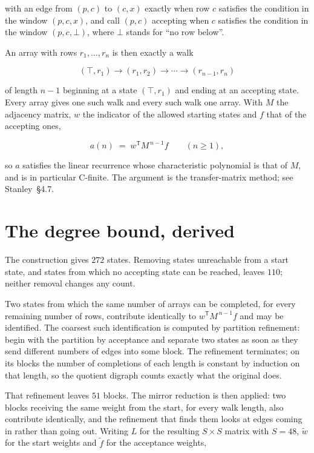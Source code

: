 \documentclass[11pt]{article}
\theoremstyle{definition}
\begin{document}
with an edge from $(p,c)$ to $(c,x)$ exactly when row $c$ satisfies the condition in the window $(p,c,x)$, and call $(p,c)$ accepting when $c$ satisfies the condition in the window $(p,c,\bot)$, where $\bot$ stands for ``no row below''.

An array with rows $r_1,\dots,r_n$ is then exactly a walk

\[(\top,r_1) \to (r_1,r_2) \to \cdots \to (r_{n-1},r_n)\]

of length $n-1$ beginning at a state $(\top,r_1)$ and ending at an accepting state. Every array gives one such walk and every such walk one array. With $M$ the adjacency matrix, $w$ the indicator of the allowed starting states and $f$ that of the accepting ones,

\[a(n) \;=\; w^{\mathsf T} M^{\,n-1} f \qquad (n \ge 1),\]

so $a$ satisfies the linear recurrence whose characteristic polynomial is that of $M$, and is in particular C-finite. The argument is the transfer-matrix method; see Stanley~\S4.7.

\section{The degree bound, derived}

The construction gives $272$ states. Removing states unreachable from a start state, and states from which no accepting state can be reached, leaves $110$; neither removal changes any count.

Two states from which the same number of arrays can be completed, for every remaining number of rows, contribute identically to $w^{\mathsf T}M^{\,n-1}f$ and may be identified. The coarsest such identification is computed by partition refinement: begin with the partition by acceptance and separate two states as soon as they send different numbers of edges into some block. The refinement terminates; on its blocks the number of completions of each length is constant by induction on that length, so the quotient digraph counts exactly what the original does.

That refinement leaves $51$ blocks. The mirror reduction is then applied: two blocks receiving the same weight from the start, for every walk length, also contribute identically, and the refinement that finds them looks at edges coming in rather than going out. Writing $L$ for the resulting $S \times S$ matrix with $S = 48$, $\tilde w$ for the start weights and $\tilde f$ for the acceptance weights,
\end{document}
